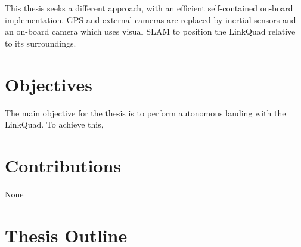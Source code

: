     This thesis seeks a different approach, with an efficient self-contained
    on-board implementation. GPS and external cameras are replaced by inertial sensors and an
    on-board camera which uses visual SLAM to position the LinkQuad relative to
    its surroundings.








\section{Objectives}
    The main objective for the thesis is to perform autonomous landing
    with the LinkQuad. To achieve this,

\section{Contributions}
    None

\section{Thesis Outline}
